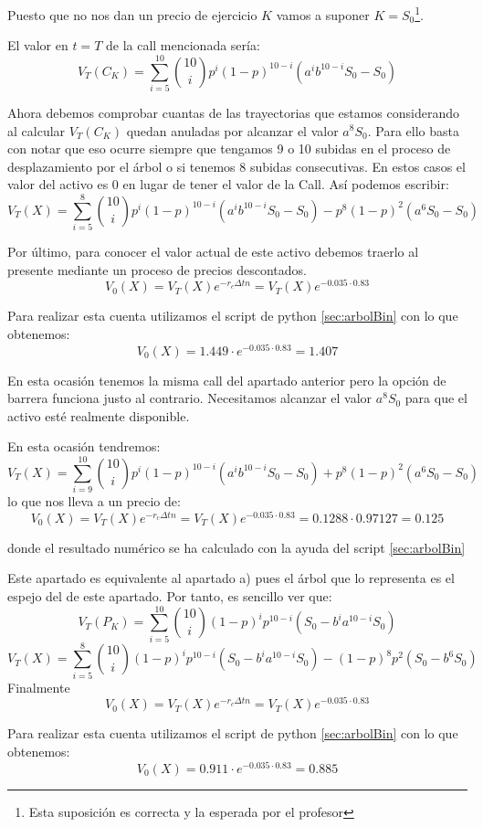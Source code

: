 \begin{problem}[2]
Puesto que no nos dan un precio de ejercicio $K$ vamos a suponer $K=S_0$\footnote{Esta suposición es correcta y la esperada por el profesor}.

El valor en $t=T$ de la call mencionada sería:
\[V_T(C_K) = \sum_{i=5}^{10}{10 \choose i}p^i(1-p)^{10-i}(a^{i}b^{10-i}S_0-S_0)\]

Ahora debemos comprobar cuantas de las trayectorias que estamos considerando al calcular $V_T(C_K)$ quedan anuladas por alcanzar el valor $a^8S_0$. Para ello basta con notar que eso ocurre siempre que tengamos 9 o 10 subidas en el proceso de desplazamiento por el árbol o si tenemos 8 subidas consecutivas. En estos casos el valor del activo es 0 en lugar de tener el valor de la Call. Así podemos escribir:
\[V_T(X)=\sum_{i=5}^{8}{10 \choose i}p^i(1-p)^{10-i}(a^{i}b^{10-i}S_0-S_0)-p^8(1-p)^2(a^6S_0-S_0)\]

Por último, para conocer el valor actual de este activo debemos traerlo al presente mediante un proceso de precios descontados.
\[V_0(X)=V_T(X)e^{-r_cΔtn}=V_T(X)e^{-0.035\cdot 0.83}\]

Para realizar esta cuenta utilizamos el script de python \ref{sec:arbolBin} con lo que obtenemos:
\[V_0(X) = 1.449\cdot e^{-0.035\cdot 0.83} = 1.407\]

\spart

En esta ocasión tenemos la misma call del apartado anterior pero la opción de barrera funciona justo al contrario. Necesitamos alcanzar el valor $a^8S_0$ para que el activo esté realmente disponible.

En esta ocasión tendremos:
\[V_T(X)=\sum_{i=9}^{10}{10 \choose i}p^i(1-p)^{10-i}(a^{i}b^{10-i}S_0-S_0)+p^8(1-p)^2(a^6S_0-S_0)\]
lo que nos lleva a un precio de:
\[V_0(X)=V_T(X)e^{-r_cΔtn}=V_T(X)e^{-0.035\cdot 0.83} = 0.1288 \cdot 0.97127 = 0.125\]

donde el resultado numérico se ha calculado con la ayuda del script \ref{sec:arbolBin}

\spart

Este apartado es equivalente al apartado a) pues el árbol que lo representa es el espejo del de este apartado. Por tanto, es sencillo ver que:
\[V_T(P_K) = \sum_{i=5}^{10}{10 \choose i}(1-p)^ip^{10-i}(S_0 - b^{i}a^{10-i}S_0)\]
\[V_T(X) =\sum_{i=5}^{8}{10 \choose i}(1-p)^ip^{10-i}(S_0-b^{i}a^{10-i}S_0)-(1-p)^8p^2(S_0-b^6S_0)\]
Finalmente
\[V_0(X)=V_T(X)e^{-r_cΔtn}=V_T(X)e^{-0.035\cdot 0.83}\]

Para realizar esta cuenta utilizamos el script de python \ref{sec:arbolBin} con lo que obtenemos:
\[V_0(X) = 0.911\cdot e^{-0.035\cdot 0.83} = 0.885\]


\end{problem}
